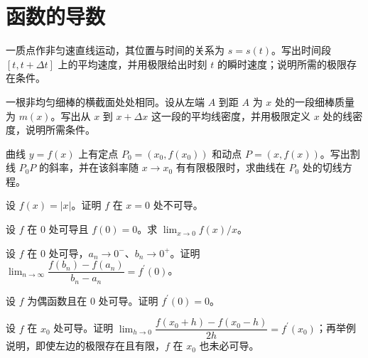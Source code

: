 \renewcommand{\thesection}{\arabic{section}}\renewcommand{\theHsection}{chapter.\arabic{section}}\setcounter{section}{2}\section{函数的导数}
\noindent\begin{minipage}{\textwidth}
一质点作非匀速直线运动，其位置与时间的关系为 $s=s(t)$。写出时间段 $[t,t+\Delta t]$ 上的平均速度，并用极限给出时刻 $t$ 的瞬时速度；说明所需的极限存在条件。
\end{minipage}\par\vfill
\noindent\begin{minipage}{\textwidth}
一根非均匀细棒的横截面处处相同。设从左端 $A$ 到距 $A$ 为 $x$ 处的一段细棒质量为 $m(x)$。写出从 $x$ 到 $x+\Delta x$ 这一段的平均线密度，并用极限定义 $x$ 处的线密度，说明所需条件。
\end{minipage}\par\vfill
\noindent\begin{minipage}{\textwidth}
曲线 $y=f(x)$ 上有定点 $P_0=(x_0,f(x_0))$ 和动点 $P=(x,f(x))$。写出割线 $P_0P$ 的斜率，并在该斜率随 $x\to x_0$ 有有限极限时，求曲线在 $P_0$ 处的切线方程。
\end{minipage}\par\vfill
\newpage
\noindent\begin{minipage}{\textwidth}
设 $f(x)=|x|$。证明 $f$ 在 $x=0$ 处不可导。
\end{minipage}\par\vfill
\noindent\begin{minipage}{\textwidth}
设 $f$ 在 $0$ 处可导且 $f(0)=0$。求 $\lim_{x\to0}f(x)/x$。
\end{minipage}\par\vfill
\noindent\begin{minipage}{\textwidth}
设 $f$ 在 $0$ 处可导，$a_n\to0^-$、$b_n\to0^+$。证明 $\lim_{n\to\infty}\dfrac{f(b_n)-f(a_n)}{b_n-a_n}=f^{\prime}(0)$。
\end{minipage}\par\vfill
\newpage
\noindent\begin{minipage}{\textwidth}
设 $f$ 为偶函数且在 $0$ 处可导。证明 $f^{\prime}(0)=0$。
\end{minipage}\par\vfill
\noindent\begin{minipage}{\textwidth}
设 $f$ 在 $x_0$ 处可导。证明 $\lim_{h\to0}\dfrac{f(x_0+h)-f(x_0-h)}{2h}=f^{\prime}(x_0)$；再举例说明，即使左边的极限存在且有限，$f$ 在 $x_0$ 也未必可导。
\end{minipage}\par\vfill
